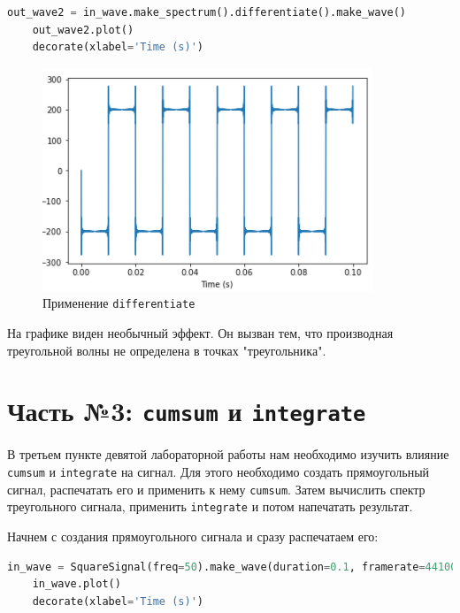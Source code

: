 \documentclass[a4paper]{article}
\begin{document}
\begin{lstlisting}[language=Python, caption= Вычисление спектра и применение \texttt{differentiate}]
    out_wave2 = in_wave.make_spectrum().differentiate().make_wave()
    out_wave2.plot()
    decorate(xlabel='Time (s)')
\end{lstlisting}
            
            \begin{figure}[H]
                \centering
                \includegraphics{ex_2_3.png}
                \caption{Применение \texttt{differentiate}}
                \label{fig:ex_2_3}
            \end{figure}
            
            На графике виден необычный эффект. Он вызван тем, что производная треугольной волны не определена в точках "треугольника".
            
    \newpage
        \section{Часть №3: \texttt{cumsum} и \texttt{integrate}}
            В третьем пункте девятой лабораторной работы нам необходимо изучить влияние \texttt{cumsum} и \texttt{integrate} на сигнал. Для этого необходимо создать прямоугольный сигнал, распечатать его и применить к нему \texttt{cumsum}. Затем вычислить спектр треугольного сигнала, применить \texttt{integrate} и потом напечатать результат. 
            
            Начнем с создания прямоугольного сигнала и сразу распечатаем его:
            
\begin{lstlisting}[language=Python, caption= Создание и вывод прямоугольного сигнала]
    in_wave = SquareSignal(freq=50).make_wave(duration=0.1, framerate=44100)
    in_wave.plot()
    decorate(xlabel='Time (s)')
\end{lstlisting}
            
\end{document}
